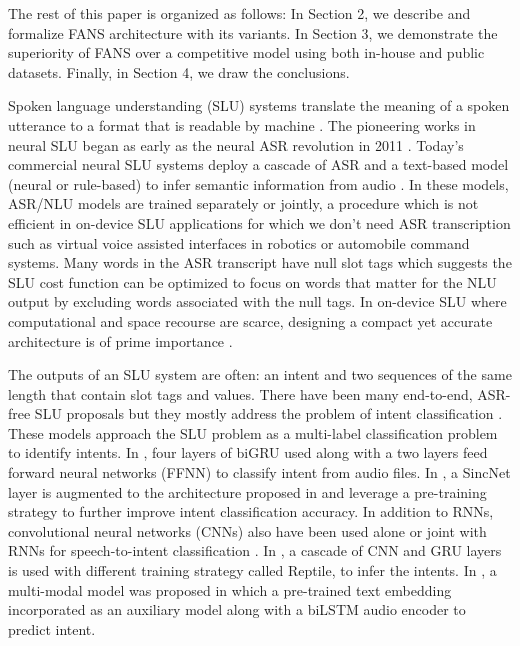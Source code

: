 \documentclass[a4paper]{article}
\begin{document}
 
 The rest of this paper is organized as follows:   In Section 2,  we describe and formalize FANS architecture with its variants. In Section 3,  we demonstrate the superiority of FANS over a competitive model using both in-house and public datasets. Finally, in Section 4, we draw the conclusions. 





\iffalse
Spoken language understanding (SLU) systems  translate  the meaning of  a spoken utterance  to a format that is readable by machine \cite{wang2005spoken,TurDeMori2011}. The pioneering works in neural SLU began as early as the neural ASR revolution in 2011 \cite{sarikaya2011deep,deng2012use,mesnil2013investigation}. Today's commercial neural SLU systems deploy a cascade of ASR and a text-based model (neural or rule-based) to infer semantic information from audio \cite{DBLP:journals/ftir/LarsonJ12}. In these models, ASR/NLU models are trained separately or jointly, a procedure which is  not efficient in on-device SLU applications for which we don't need ASR transcription such as virtual voice assisted interfaces in robotics or automobile command systems.  Many words in the ASR  transcript have null slot tags which suggests the SLU cost function can be optimized to focus on words that matter for the NLU output by excluding words associated with the null tags.  In  on-device SLU where computational and space recourse are scarce,  designing  a compact yet accurate architecture is of prime importance \cite{lee2015spoken,lugosch2019speech,haghani2018audio,renkens2018capsule,chen2018spoken,tomashenko2019recent,vu2016bi,liu2017topic,chen2019transfer,huang2019adapting,tomashenko2020dialogue,dinarelli2020data,wang2020large}. 

 The outputs of  an SLU system are often: an intent and two sequences of the same length that contain slot tags and values. There have been many end-to-end, ASR-free SLU proposals but  they mostly address the problem of intent classification \cite{qian2017exploring,lugosch2019speech,vu2016bi,serdyuk2018towards,liu2017topic,tian2020improving}. These models  approach the SLU problem as a multi-label classification problem to identify intents.  In \cite{serdyuk2018towards}, four layers of biGRU used along with a two layers feed forward neural networks (FFNN) to classify intent from audio files. In \cite{lugosch2019speech},  a SincNet layer \cite{Ravanelli2018}  is augmented to the architecture proposed in \cite{serdyuk2018towards} and leverage a pre-training strategy to further improve intent classification accuracy. 
 In addition to RNNs, convolutional neural networks (CNNs) also have been used alone or joint with RNNs for speech-to-intent classification \cite{liu2017topic,tian2020improving}.
In \cite{tian2020improving},    a cascade of CNN and GRU layers is used with different training strategy called Reptile, to infer the intents.  
  In \cite{9053281},  a multi-modal model was proposed in which a pre-trained text embedding incorporated as an auxiliary model along with  a biLSTM audio encoder to predict intent. 
 
\end{document}
